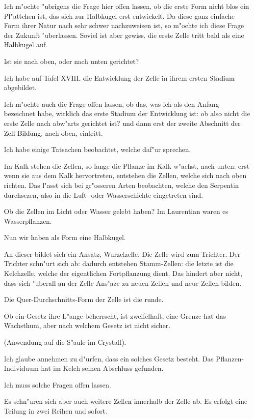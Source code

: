 \documentclass[a4paper, 11pt, oneside, german]{article}
\begin{document}
Ich m"ochte "ubrigens die Frage hier offen lassen, ob die erste Form nicht blos ein Pl"attchen ist, das sich zur Halbkugel erst entwickelt. Da diese ganz einfache Form ihrer Natur nach sehr schwer nachzuweisen ist, so m"ochte ich diese Frage der Zukunft "uberlassen. Soviel ist aber gewiss, die erste Zelle tritt bald als eine Halbkugel auf.

Ist sie nach oben, oder nach unten gerichtet?

Ich habe auf Tafel XVIII. die Entwicklung der Zelle in ihrem ersten Stadium abgebildet.

Ich m"ochte auch die Frage offen lassen, ob das, was ich als den Anfang bezeichnet habe, wirklich das erste Stadium der Entwicklung ist: ob also nicht die erste Zelle nach abw"arts gerichtet ist? und dann erst der zweite Abschnitt der Zell-Bildung, nach oben, eintritt.

Ich habe einige Tatsachen beobachtet, welche daf"ur sprechen.

Im Kalk stehen die Zellen, so lange die Pflanze im Kalk w"achst, nach unten: erst wenn sie aus dem Kalk hervortreten, entstehen die Zellen, welche sich nach oben richten. Das l"asst sich bei gr"osseren Arten beobachten, welche den Serpentin durchsezen, also in die Luft- oder Wasserschichte eingetreten sind.

Ob die Zellen im Licht oder Wasser gelebt haben? Im Laurentian waren es Wasserpflanzen.

Nun wir haben als Form eine Halbkugel.

An dieser bildet sich ein Ansatz, Wurzelzelle. Die Zelle wird zum Trichter. Der Trichter schn"urt sich ab: dadurch entstehen Stamm-Zellen: die letzte ist die Kelchzelle, welche der eigentlichen Fortpflanzung dient. Das hindert aber nicht, dass sich "uberall an der Zelle Ans"aze zu neuen Zellen und neue Zellen bilden.

Die Quer-Durchschnitts-Form der Zelle ist die runde.

Ob ein Gesetz ihre L"ange beherrscht, ist zweifelhaft, eine Grenze hat das Wachsthum, aber nach welchem Gesetz ist nicht sicher.

(Anwendung auf die S"aule im Crystall).

Ich glaube annehmen zu d"urfen, dass ein solches Gesetz besteht. Das Pflanzen-Individuum hat im Kelch seinen Abschluss gefunden.

Ich muss solche Fragen offen lassen.

Es schn"uren sich aber auch weitere Zellen innerhalb der Zelle ab. Es erfolgt eine Teilung in zwei Reihen und sofort.
\end{document}
